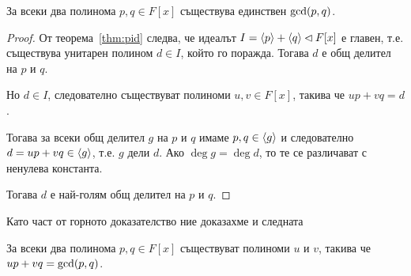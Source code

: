 \documentclass[numbers=endperiod, DIV=15]{scrartcl}
\begin{document}
\begin{theorem}
  За всеки два полинома $p, q \in F[x]$ съществува единствен $\operatorname{gcd}(p, q)$.
\end{theorem}
\begin{proof}
  От теорема~\ref{thm:pid} следва, че идеалът $I = \left\langle p \right\rangle + \left\langle q \right\rangle \lhd F[x]$ е главен, т.е. съществува унитарен полином $d \in I$, който го поражда.
  Тогава $d$ е общ делител на $p$ и $q$.

  Но $d \in I$, следователно съществуват полиноми $u, v \in F[x]$, такива че $u p + v q = d$.

  Тогава за всеки общ делител $g$ на $p$ и $q$ имаме $p, q \in \left\langle g \right\rangle$ и следователно $d = u p + v q \in \left\langle g \right\rangle$, т.е. $g$ дели $d$. Ако $\deg g = \deg d$, то те се различават с ненулева константа.

  Тогава $d$ е най-голям общ делител на $p$ и $q$.
\end{proof}

Като част от горното доказателство ние доказахме и следната
\begin{theorem}
  За всеки два полинома $p, q \in F[x]$ съществуват полиноми $u$ и $v$, такива че $u p + v q = \operatorname{gcd}(p, q)$.
\end{theorem}
\end{document}

